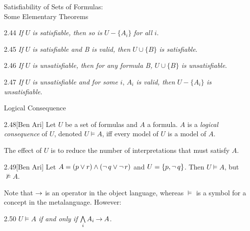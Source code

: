 \documentclass[style=sailor,size=12pt]{powerdot}
\begin{document}
\begin{wideslide}[bm=,toc=]{Satisfiability of Sets of Formulas:\\ Some Elementary
Theorems}
\begin{thm}{2.44}
{ \em If} $U$ {\em is satisfiable, then so is} $U - \{A_i\}$ {\em for all} $i$. 
\end{thm}
\begin{thm}{2.45}
{ \em If} $U$ {\em is satisfiable and B is valid, then} $U \cup \{B\}$ {\em is
  satisfiable}. 
\end{thm}
\begin{thm}{2.46}
{ \em If} $U$ {\em is unsatisfiable, then for any formula B,} $U \cup \{B\}$ {\em is
  unsatisfiable}. 
\end{thm}
\begin{thm}{2.47}
{ \em If} $U$ {\em is unsatisfiable and for some } $i$, $A_i$ { \em is valid,
  then} $U - \{A_i\}$ {\em is unsatisfiable}. 
\end{thm}
\end{wideslide}

\begin{wideslide}[bm=,toc=]{Logical Consequence}
\begin{defn}{2.48}[Ben Ari]
Let $U$ be a set of formulas and $A$ a formula. $A$ is a \emph{logical
  consequence} of $U$, denoted $U \models A$, iff every model of $U$ is a
  model of $A$.
\end{defn}
The effect of $U$ is to reduce the number of interpretations that must satisfy
$A$.
\begin{ex}{2.49}[Ben Ari]
Let $A = (p \lor r) \land (\mathop{\neg} q \lor \mathop{\neg} r)$ and $U = \{p,\mathop{\neg} q\}$.
Then $U \models A$, but $\not\models A$.
\end{ex}
Note that $\mathbin{\rightarrow}$ is an operator in the object language, whereas $\models$
is a symbol for a concept in the metalanguage. However:
\begin{thm}{2.50}
$U \models A$ \emph{if and only if } $\bigwedge\limits_{i} A_i \mathbin{\rightarrow} A$. 
\end{thm}
\end{wideslide}
\end{document}
